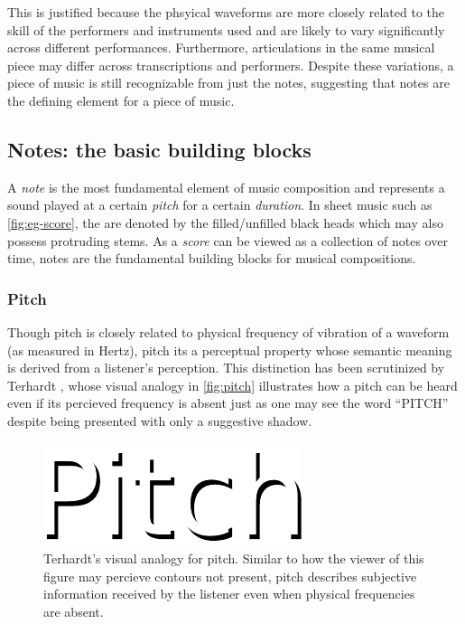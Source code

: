\documentclass[dissertation.tex]{subfiles}
\begin{document}
This is justified because the phsyical waveforms are more closely related
to the skill of the performers and instruments used and are likely to vary
significantly across different performances. Furthermore, articulations in
the same musical piece may differ across transcriptions and performers.
Despite these variations, a piece of music is still recognizable from just the
notes, suggesting that notes are the defining element for a piece of music.

\subsection{Notes: the basic building blocks}

A \emph{note} is the most fundamental element of music composition and
represents a sound played at a certain \emph{pitch} for a certain
\emph{duration}. In sheet music such as \autoref{fig:eg-score}, the are denoted
by the filled/unfilled black heads which may also possess protruding stems.
As a \emph{score} can be viewed as a collection of notes over time, notes are
the fundamental building blocks for musical compositions.

\subsubsection{Pitch}

Though pitch is closely related to physical frequency of vibration of a
waveform (as measured in Hertz), pitch its a perceptual property whose semantic
meaning is derived from a listener's perception. This distinction has been
scrutinized by Terhardt
\cite{:/content/asa/journal/jasa/55/5/10.1121/1.1914648}, whose visual analogy
in \autoref{fig:pitch} illustrates how a pitch can be heard even if its
percieved frequency is absent just as one may see the word ``PITCH'' despite
being presented with only a suggestive shadow.

\begin{figure}[htpb]
    \centering
    \includegraphics[width=0.6\linewidth]{Figures/pitch.pdf}
    \caption{Terhardt's visual analogy for pitch. Similar to how
        the viewer of this figure may percieve contours not present, pitch
        describes subjective information received by the listener even when
    physical frequencies are absent.}
    \label{fig:pitch}
\end{figure}
\end{document}
